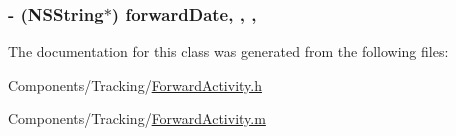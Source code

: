 \hypertarget{interface_forward_activity_a3f3583cc908d4fc17e61bb45d1b15299}{
\subsubsection[{forward\-Date}]{\setlength{\rightskip}{0pt plus 5cm}-\/ (N\-S\-String$\ast$) forward\-Date\hspace{0.3cm}{\ttfamily [read]}, {\ttfamily [write]}, {\ttfamily [nonatomic]}, {\ttfamily [strong]}}}\label{interface_forward_activity_a3f3583cc908d4fc17e61bb45d1b15299}


The documentation for this class was generated from the following files\-:\begin{DoxyCompactItemize}
\item 
Components/\-Tracking/\hyperlink{_forward_activity_8h}{Forward\-Activity.\-h}\item 
Components/\-Tracking/\hyperlink{_forward_activity_8m}{Forward\-Activity.\-m}\end{DoxyCompactItemize}
